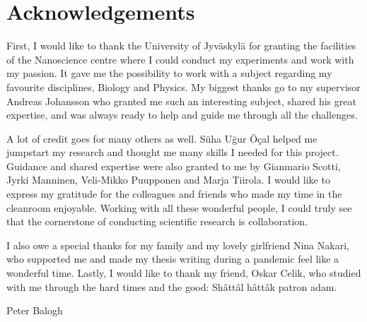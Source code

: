 \documentclass[final]{jyflluk}
\begin{document}
\section*{Acknowledgements}

First, I would like to thank the University of Jyväskylä for granting the facilities of the Nanoscience centre where I could conduct my experiments and work with my passion. It gave me the possibility to work with a subject regarding my favourite disciplines, Biology and Physics. My biggest thanks go to my supervisor Andreas Johansson who granted me such an interesting subject, shared his great expertise, and was always ready to help and guide me through all the challenges.

A lot of credit goes for many others as well. Süha Uğur Öçal helped me jumpstart my research and thought me many skills I needed for this project. Guidance and shared expertise were also granted to me by Gianmario Scotti, Jyrki Manninen, Veli-Mikko Puupponen and Marja Tiirola. I would like to express my gratitude for the colleagues and friends who made my time in the cleanroom enjoyable. Working with all these wonderful people, I could truly see that the cornerstone of conducting scientific research is collaboration.

I also owe a special thanks for my family and my lovely girlfriend Nina Nakari, who supported me and made my thesis writing during a pandemic feel like a wonderful time. Lastly, I would like to thank my friend, Oskar Celik, who studied with me through the hard times and the good: Shâttâl hâttâk patron adam.


\bigskip



Peter Balogh

\tableofcontents

\newcommand{\vaali}
    {
    \vskip  0.05in
    }
\end{document}

